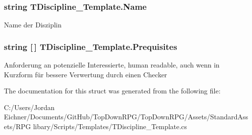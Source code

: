 \subsubsection[{Name}]{\setlength{\rightskip}{0pt plus 5cm}string T\+Discipline\+\_\+\+Template.\+Name}\label{struct_t_discipline___template_aae835040a77ff49d836137add218d1ce}
Name der Disziplin \hypertarget{struct_t_discipline___template_a3ea2df44f609935eb4f04eda1a6434d0}{}
\subsubsection[{Prequisites}]{\setlength{\rightskip}{0pt plus 5cm}string \mbox{[}$\,$\mbox{]} T\+Discipline\+\_\+\+Template.\+Prequisites}\label{struct_t_discipline___template_a3ea2df44f609935eb4f04eda1a6434d0}
Anforderung an potenzielle Interessierte, human readable, auch wenn in Kurzform für bessere Verwertung durch einen Checker 

The documentation for this struct was generated from the following file\+:\begin{DoxyCompactItemize}
\item 
C\+:/\+Users/\+Jordan Eichner/\+Documents/\+Git\+Hub/\+Top\+Down\+R\+P\+G/\+Top\+Down\+R\+P\+G/\+Assets/\+Standard\+Assets/\+R\+P\+G libary/\+Scripts/\+Templates/T\+Discipline\+\_\+\+Template.\+cs\end{DoxyCompactItemize}
